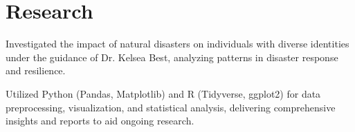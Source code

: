 \documentclass[]{farhan-resume-openfont}
\begin{document}
\begin{minipage}[t]{0.70\textwidth}
    \section{Research}
    \begin{tightemize}
        \vspace{10pt}
        \item Investigated the impact of natural disasters on individuals with diverse
        identities under the guidance of Dr. Kelsea Best, analyzing patterns in
        disaster response and resilience.
        \item Utilized Python (Pandas, Matplotlib) and R (Tidyverse, ggplot2) for data
        preprocessing, visualization, and statistical analysis, delivering
        comprehensive insights and reports to aid ongoing research.
    \end{tightemize}
\end{minipage}
\end{document}
